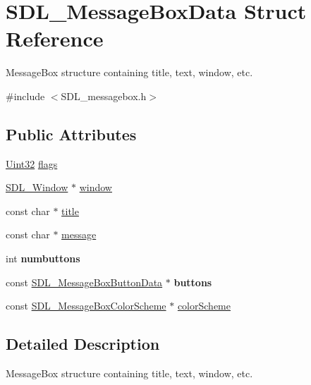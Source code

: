 \hypertarget{struct_s_d_l___message_box_data}{}\section{S\+D\+L\+\_\+\+Message\+Box\+Data Struct Reference}
\label{struct_s_d_l___message_box_data}


Message\+Box structure containing title, text, window, etc.  




{\ttfamily \#include $<$S\+D\+L\+\_\+messagebox.\+h$>$}

\subsection*{Public Attributes}
\begin{DoxyCompactItemize}
\item 
\hyperlink{_s_d_l__stdinc_8h_add440eff171ea5f55cb00c4a9ab8672d}{Uint32} \hyperlink{struct_s_d_l___message_box_data_a113d016f760bf4e4156b0f376358d6a0}{flags}
\item 
\hyperlink{_s_d_l__video_8h_a55a196c7d3b8497538632c79ae1e6392}{S\+D\+L\+\_\+\+Window} $\ast$ \hyperlink{struct_s_d_l___message_box_data_a5c333bc93705c66068e140bc28daedcb}{window}
\item 
const char $\ast$ \hyperlink{struct_s_d_l___message_box_data_a93ceeafeed20b553ad4c86c9be37f117}{title}
\item 
const char $\ast$ \hyperlink{struct_s_d_l___message_box_data_ada6ae208a1f85adabbd7a7a08ca609c8}{message}
\item 
\mbox{\label{struct_s_d_l___message_box_data_a133f4fef549cc0cb14b799af35f3dc5a}} 
int {\bfseries numbuttons}
\item 
\mbox{\label{struct_s_d_l___message_box_data_a265e47aab749e384661ae91d3e11e0db}} 
const \hyperlink{struct_s_d_l___message_box_button_data}{S\+D\+L\+\_\+\+Message\+Box\+Button\+Data} $\ast$ {\bfseries buttons}
\item 
const \hyperlink{struct_s_d_l___message_box_color_scheme}{S\+D\+L\+\_\+\+Message\+Box\+Color\+Scheme} $\ast$ \hyperlink{struct_s_d_l___message_box_data_a18744865a3e89e260db5f01aee579e35}{color\+Scheme}
\end{DoxyCompactItemize}


\subsection{Detailed Description}
Message\+Box structure containing title, text, window, etc. 

